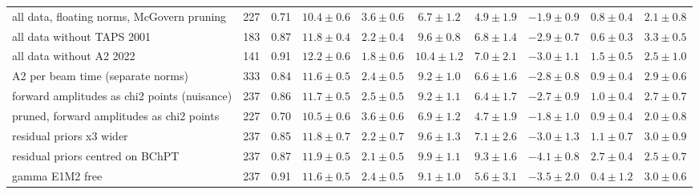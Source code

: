 \begin{tabular}{l r c cccc ccc}
all data, floating norms, McGovern pruning & 227 & 0.71 & $10.4\pm0.6$ & $3.6\pm0.6$ & $6.7\pm1.2$ & $4.9\pm1.9$ & $-1.9\pm0.9$ & $0.8\pm0.4$ & $2.1\pm0.8$\\
all data without TAPS 2001 & 183 & 0.87 & $11.8\pm0.4$ & $2.2\pm0.4$ & $9.6\pm0.8$ & $6.8\pm1.4$ & $-2.9\pm0.7$ & $0.6\pm0.3$ & $3.3\pm0.5$\\
all data without A2 2022 & 141 & 0.91 & $12.2\pm0.6$ & $1.8\pm0.6$ & $10.4\pm1.2$ & $7.0\pm2.1$ & $-3.0\pm1.1$ & $1.5\pm0.5$ & $2.5\pm1.0$\\
A2 per beam time (separate norms) & 333 & 0.84 & $11.6\pm0.5$ & $2.4\pm0.5$ & $9.2\pm1.0$ & $6.6\pm1.6$ & $-2.8\pm0.8$ & $0.9\pm0.4$ & $2.9\pm0.6$\\
forward amplitudes as chi2 points (nuisance) & 237 & 0.86 & $11.7\pm0.5$ & $2.5\pm0.5$ & $9.2\pm1.1$ & $6.4\pm1.7$ & $-2.7\pm0.9$ & $1.0\pm0.4$ & $2.7\pm0.7$\\
pruned, forward amplitudes as chi2 points & 227 & 0.70 & $10.5\pm0.6$ & $3.6\pm0.6$ & $6.9\pm1.2$ & $4.7\pm1.9$ & $-1.8\pm1.0$ & $0.9\pm0.4$ & $2.0\pm0.8$\\
residual priors x3 wider & 237 & 0.85 & $11.8\pm0.7$ & $2.2\pm0.7$ & $9.6\pm1.3$ & $7.1\pm2.6$ & $-3.0\pm1.3$ & $1.1\pm0.7$ & $3.0\pm0.9$\\
residual priors centred on BChPT & 237 & 0.87 & $11.9\pm0.5$ & $2.1\pm0.5$ & $9.9\pm1.1$ & $9.3\pm1.6$ & $-4.1\pm0.8$ & $2.7\pm0.4$ & $2.5\pm0.7$\\
gamma E1M2 free & 237 & 0.91 & $11.6\pm0.5$ & $2.4\pm0.5$ & $9.1\pm1.0$ & $5.6\pm3.1$ & $-3.5\pm2.0$ & $0.4\pm1.2$ & $3.0\pm0.6$\\
\hline
\end{tabular}

